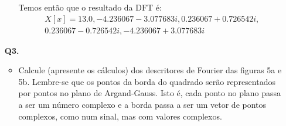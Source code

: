 \documentclass[12pt]{article}
\begin{document}
\begin{itemize}
\begin{itemize}
Temos então que o resultado da DFT é:
\begin{multline*}
    X[x] = 13.0, -4.236067-3.077683i, 0.236067+0.726542i, \\
           0.236067-0.726542i, -4.236067+3.077683i
\end{multline*}

\end{itemize}
%
%
%
\item[{\bf Q3.}]
\begin{itemize}
\item Calcule (apresente os cálculos) dos descritores de Fourier das
  figuras 5a e 5b. Lembre-se que os pontos da
  borda do quadrado serão representados por pontos no plano de
  Argand-Gauss. Isto é, cada ponto no plano passa a ser um número
  complexo e a borda passa a ser um vetor de pontos complexos, como
  num sinal, mas com valores complexos.


\end{itemize}
\end{itemize}
\end{document}
